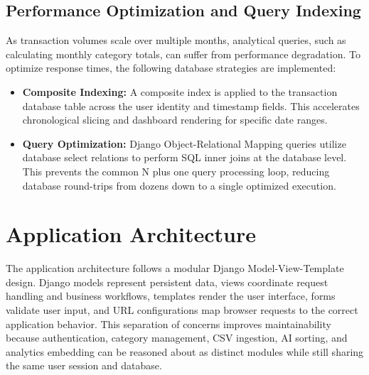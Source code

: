 \subsection{Performance Optimization and Query Indexing}
As transaction volumes scale over multiple months, analytical queries, such as calculating monthly category totals, can suffer from performance degradation. To optimize response times, the following database strategies are implemented:
\begin{itemize}
	\item \textbf{Composite Indexing:} A composite index is applied to the transaction database table across the user identity and timestamp fields. This accelerates chronological slicing and dashboard rendering for specific date ranges.
	\item \textbf{Query Optimization:} Django Object-Relational Mapping queries utilize database select relations to perform SQL inner joins at the database level. This prevents the common N plus one query processing loop, reducing database round-trips from dozens down to a single optimized execution.
\end{itemize}

\section{Application Architecture}
The application architecture follows a modular Django Model-View-Template design. Django models represent persistent data, views coordinate request handling and business workflows, templates render the user interface, forms validate user input, and URL configurations map browser requests to the correct application behavior. This separation of concerns improves maintainability because authentication, category management, CSV ingestion, AI sorting, and analytics embedding can be reasoned about as distinct modules while still sharing the same user session and database.

